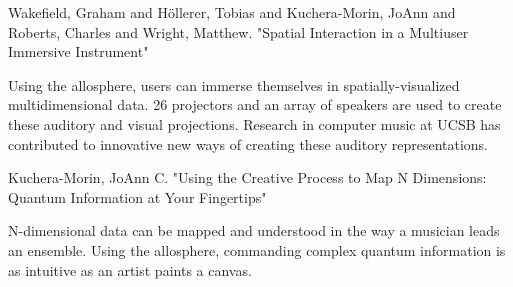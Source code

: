 Wakefield, Graham and H\"{o}llerer, Tobias and Kuchera-Morin, JoAnn and Roberts, Charles and Wright, Matthew. "Spatial Interaction in a Multiuser Immersive Instrument"\cite{allo1}

Using the allosphere, users can immerse themselves in spatially-visualized multidimensional data. 26 projectors and an array of speakers are used to create these auditory and visual projections. Research in computer music at UCSB has contributed to innovative new ways of creating these auditory representations. 

Kuchera-Morin, JoAnn C. "Using the Creative Process to Map N Dimensions: Quantum Information at Your Fingertips"\cite{allo2}

N-dimensional data can be mapped and understood in the way a musician leads an ensemble. Using the allosphere, commanding complex quantum information is as intuitive as an artist paints a canvas.
